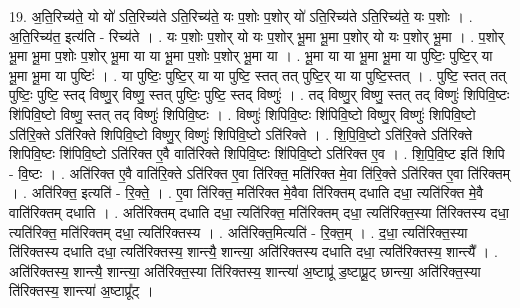 \documentclass[17pt]{extarticle}
\begin{document}
19. अ॒ति॒रिच्य॑ते॒ यो यो॑ ऽति॒रिच्य॑ते ऽति॒रिच्य॑ते॒ यः प॒शोः प॒शोर् यो॑ ऽति॒रिच्य॑ते ऽति॒रिच्य॑ते॒ यः प॒शोः । . अ॒ति॒रिच्य॑त॒ इत्य॑ति - रिच्य॑ते । . यः प॒शोः प॒शोर् यो यः प॒शोर् भू॒मा भू॒मा प॒शोर् यो यः प॒शोर् भू॒मा । . प॒शोर् भू॒मा भू॒मा प॒शोः प॒शोर् भू॒मा या या भू॒मा प॒शोः प॒शोर् भू॒मा या । . भू॒मा या या भू॒मा भू॒मा या पुष्टिः॒ पुष्टि॒र् या भू॒मा भू॒मा या पुष्टिः॑ । . या पुष्टिः॒ पुष्टि॒र् या या पुष्टि॒ स्तत् तत् पुष्टि॒र् या या पुष्टि॒स्तत् । . पुष्टि॒ स्तत् तत् पुष्टिः॒ पुष्टि॒ स्तद् विष्णु॒र् विष्णु॒ स्तत् पुष्टिः॒ पुष्टि॒ स्तद् विष्णुः॑ । . तद् विष्णु॒र् विष्णु॒ स्तत् तद् विष्णुः॑ शिपिवि॒ष्टः शि॑पिवि॒ष्टो विष्णु॒ स्तत् तद् विष्णुः॑ शिपिवि॒ष्टः । . विष्णुः॑ शिपिवि॒ष्टः शि॑पिवि॒ष्टो विष्णु॒र् विष्णुः॑ शिपिवि॒ष्टो ऽति॑रि॒क्ते ऽति॑रिक्ते शिपिवि॒ष्टो विष्णु॒र् विष्णुः॑ शिपिवि॒ष्टो ऽति॑रिक्ते । . शि॒पि॒वि॒ष्टो ऽति॑रि॒क्ते ऽति॑रिक्ते शिपिवि॒ष्टः शि॑पिवि॒ष्टो ऽति॑रिक्त ए॒वै वाति॑रिक्ते शिपिवि॒ष्टः शि॑पिवि॒ष्टो ऽति॑रिक्त ए॒व । . शि॒पि॒वि॒ष्ट इति॑ शिपि - वि॒ष्टः । . अति॑रिक्त ए॒वै वाति॑रि॒क्ते ऽति॑रिक्त ए॒वा ति॑रिक्त॒ मति॑रिक्त मे॒वा ति॑रि॒क्ते ऽति॑रिक्त ए॒वा ति॑रिक्तम् । . अति॑रिक्त॒ इत्यति॑ - रि॒क्ते॒ । . ए॒वा ति॑रिक्त॒ मति॑रिक्त मे॒वैवा ति॑रिक्तम् दधाति दधा॒ त्यति॑रिक्त मे॒वै वाति॑रिक्तम् दधाति । . अति॑रिक्तम् दधाति दधा॒ त्यति॑रिक्त॒ मति॑रिक्तम् दधा॒ त्यति॑रिक्त॒स्या ति॑रिक्तस्य दधा॒ त्यति॑रिक्त॒ मति॑रिक्तम् दधा॒ त्यति॑रिक्तस्य । . अति॑रिक्त॒मित्यति॑ - रि॒क्त॒म् । . द॒धा॒ त्यति॑रिक्त॒स्या ति॑रिक्तस्य दधाति दधा॒ त्यति॑रिक्तस्य॒ शान्त्यै॒ शान्त्या॒ अति॑रिक्तस्य दधाति दधा॒ त्यति॑रिक्तस्य॒ शान्त्यै᳚ । . अति॑रिक्तस्य॒ शान्त्यै॒ शान्त्या॒ अति॑रिक्त॒स्या ति॑रिक्तस्य॒ शान्त्या॑ अ॒ष्टाप्रू॑ ड॒ष्टाप्रू॒ट् छान्त्या॒ अति॑रिक्त॒स्या ति॑रिक्तस्य॒ शान्त्या॑ अ॒ष्टाप्रू᳚ट् । \newline
\end{document}
